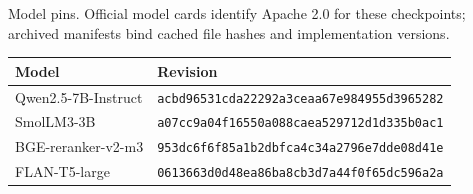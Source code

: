 \begin{supplementtable}\caption{Model pins. Official model cards identify Apache 2.0 for these checkpoints; archived manifests bind cached file hashes and implementation versions.}\label{tab:si-models}
\sncstable
\begin{tabularx}{\linewidth}{@{}L{3.2cm}Y@{}}\toprule Model & Revision \\\midrule
Qwen2.5-7B-Instruct & \nolinkurl{acbd96531cda22292a3ceaa67e984955d3965282} \\
SmolLM3-3B & \nolinkurl{a07cc9a04f16550a088caea529712d1d335b0ac1} \\
BGE-reranker-v2-m3 & \nolinkurl{953dc6f6f85a1b2dbfca4c34a2796e7dde08d41e} \\
FLAN-T5-large & \nolinkurl{0613663d0d48ea86ba8cb3d7a44f0f65dc596a2a} \\
\bottomrule\end{tabularx}\end{supplementtable}